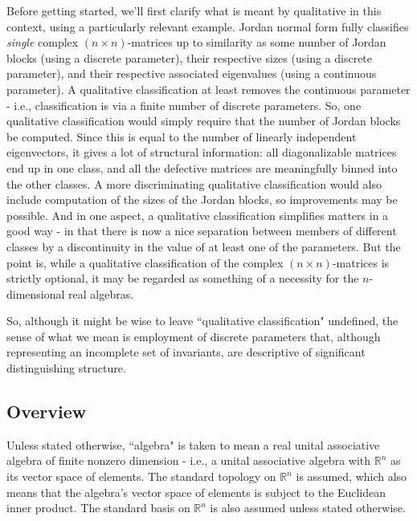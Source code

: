 \documentclass{amsart}
\numberwithin{equation}{section}
\theoremstyle{definition}
\numberwithin{theorem}{section}
\begin{document}
Before getting started, we'll first clarify what is meant by qualitative in this context, using a particularly relevant example.  Jordan normal form fully classifies {\it single} complex $(n\times n)$-matrices up to similarity as some number of Jordan blocks (using a discrete parameter), their respective sizes (using a discrete parameter), and their respective associated eigenvalues (using a continuous parameter).   A qualitative classification at least removes the continuous parameter - i.e.,  classification is via a finite number of discrete parameters.  So, one qualitative classification would simply require that the number of Jordan blocks be computed.  Since this is equal to the number of linearly independent eigenvectors, it gives a lot of structural information: all diagonalizable matrices end up in one class, and all the defective matrices are meaningfully binned into the other classes.   A more discriminating qualitative classification would also include computation of the sizes of the Jordan blocks, so improvements may be possible.  And in one aspect, a qualitative classification simplifies matters in a good way - in that there is now a nice separation between members of different classes by a discontinuity in the value of at least one of the parameters.  But the point is, while a qualitative classification of the complex $(n\times n)$-matrices is strictly optional, it may be regarded as something of a necessity for the $n$-dimensional real algebras. 

So, although it might be wise to leave ``qualitative classification" undefined, the sense of what we mean is employment of discrete parameters that, although representing an incomplete set of invariants, are descriptive of significant distinguishing structure.
      
\subsection{Overview}  Unless stated otherwise, ``algebra" is taken to mean a real unital associative algebra of finite nonzero dimension - i.e., a unital associative algebra with $\mathbb{R}^n$ as its vector space of elements.  The standard topology on $\mathbb{R}^n$ is assumed, which also means that the algebra's vector space of elements is subject to the Euclidean inner product. The standard basis on $\mathbb{R}^n$ is also assumed unless stated otherwise.
\end{document}
